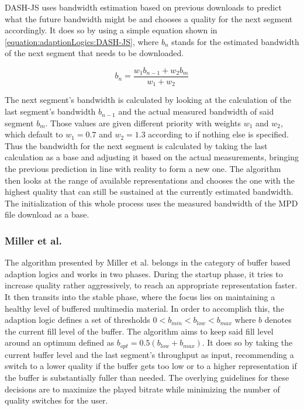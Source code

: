 DASH-JS \cite{RLMT12} uses bandwidth estimation based on previous downloads to predict what the future bandwidth might be and chooses a quality for the next segment accordingly. It does so by using a simple equation shown in \ref{equation:adaptionLogics:DASH-JS}, where $b_{n}$ stands for the estimated bandwidth of the next segment that needs to be downloaded.

\begin{equation}
b_{n} = \dfrac{w_{1}b_{n-1} + w_{2}b_{m}}{w_{1}+w_{2}}
\label{equation:adaptionLogics:DASH-JS}
\end{equation}

The next segment's bandwidth is calculated by looking at the calculation of the last segment's bandwidth $b_{n-1}$ and the actual measured bandwidth of said segment $b_{m}$. Those values are given different priority with weights $w_{1}$ and $w_{2}$, which default to $w_{1}=0.7$ and $w_{2}=1.3$ according to \cite{RLMT12} if nothing else is specified. Thus the bandwidth for the next segment is calculated by taking the last calculation as a base and adjusting it based on the actual measurements, bringing the previous prediction in line with reality to form a new one. The algorithm then looks at the range of available representations and chooses the one with the highest quality that can still be sustained at the currently estimated bandwidth. The initialization of this whole process uses the measured bandwidth of the MPD file download as a base.
\subsubsection{Miller et al.}
The algorithm presented by Miller et al. \cite{MQGW12b} belongs in the category of buffer based adaption logics and works in two phases. During the startup phase, it tries to increase quality rather aggressively, to reach an appropriate representation faster. It then transits into the stable phase, where the focus lies on maintaining a healthy level of buffered multimedia material. In order to accomplish this, the adaption logic defines a set of thresholds $0 < b_{min} < b_{low} < b_{max}$ where $b$ denotes the current fill level of the buffer. The algorithm aims to keep said fill level around an optimum defined as $b_{opt}= 0.5(b_{low}+b_{max})$. It does so by taking the current buffer level and the last segment's throughput as input, recommending a switch to a lower quality if the buffer gets too low or to a higher representation if the buffer is substantially fuller than needed. The overlying guidelines for these decisions are to maximize the played bitrate while minimizing the number of quality switches for the user.


